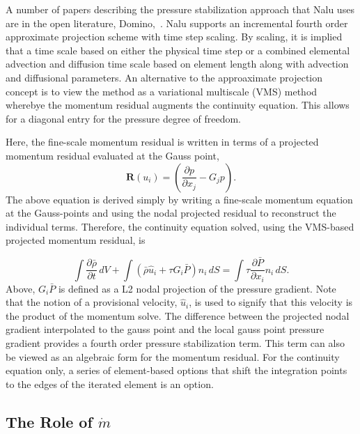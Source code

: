 A number of papers describing the pressure stabilization approach that Nalu uses are in the open literature,
Domino,~\cite{Domino:2006, Domino:2008, Domino:2014}.  Nalu supports an incremental
fourth order approximate projection scheme with time step 
scaling. By scaling, it is implied that a time scale based on either the physical time step or 
a combined elemental advection and diffusion time scale based on element length along
with advection and diffusional parameters. An alternative to the approaximate projection
concept is to view the method as a variational multiscale (VMS) method wherebye the momentum residual
augments the continuity equation. This allows for a diagonal entry for the pressure degree of freedom.

Here, the fine-scale momentum residual is written in terms of a projected momentum residual 
evaluated at the Gauss point,
\begin{equation}
  \mathbf{R}(u_i) = (\frac{\partial p} {\partial x_j} - G_j p ).
\label{fineScaleMomentum}
\end{equation}
The above equation is derived simply by writing a fine-scale momentum equation at the Gauss-points 
and using the nodal projected residual to reconstruct the individual terms.
Therefore, the continuity equation solved, using the VMS-based projected momentum residual, is

\begin{equation}
\int \frac{\partial \bar{\rho}} {\partial t}\, dV
+ \int \left( \bar{\rho} \hat{u}_i + \tau G_i \bar{P} \right) n_i\, dS
  = \int \tau \frac{\partial \bar{P}}{\partial x_i} n_i\, dS.
\end{equation}
%
Above, $G_i \bar{P}$ is defined as a L2 nodal projection of the pressure gradient. Note that the notion of 
a provisional velocity, $\hat u_i$, is used to signify that this velocity is the product of the momentum 
solve. The difference between the projected nodal gradient interpolated to the gauss point and the 
local gauss point pressure gradient provides a fourth order pressure stabilization
term. This term can also be viewed as an algebraic form for the momentum residual. For the continuity
equation only, a series of element-based options that shift the integration points to the edges of the 
iterated element is an option.

\subsection{The Role of $\dot m$}

